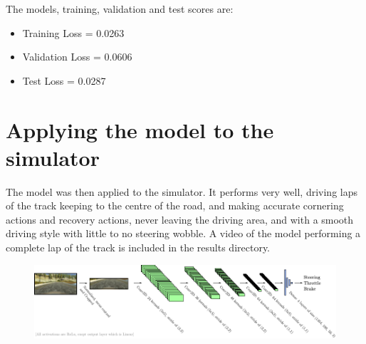 \documentclass[letterpaper,12pt]{article}
\begin{document}
\noindent The models, training, validation and test scores are:
\begin{itemize}
\item Training Loss =  0.0263
\item Validation Loss = 0.0606
\item Test Loss = 0.0287
\end{itemize}


\section{Applying the model to the simulator}
The model was then applied to the simulator. It performs very well, driving laps of the track keeping to the centre of the road, and making accurate cornering actions and recovery actions, never leaving the driving area, and with a smooth driving style with little to no steering wobble. A video of the model performing a complete lap of the track is included in the results directory. 
\FloatBarrier
\begin{figure}
\centering
\includegraphics[scale=1.2]{../results/model.pdf}
\end{figure}
\FloatBarrier
\end{document}
